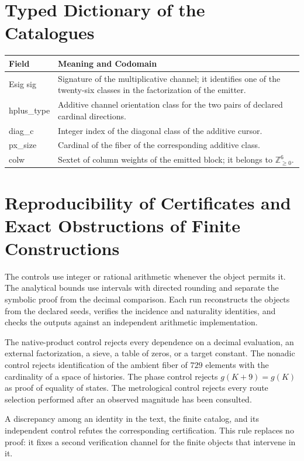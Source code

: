 \section{Typed Dictionary of the Catalogues}

\begin{longtable}{>{\ttfamily}p{}>{\raggedright\arraybackslash}p{}}
\toprule
Field & Meaning and Codomain\\
\midrule
\endhead
Esig sig & Signature of the multiplicative channel; it identifies one of the twenty-six
classes in the factorization of the emitter.\\
hplus\_type & Additive channel orientation class for the two pairs of declared cardinal directions.\\
diag\_c & Integer index of the diagonal class of the additive cursor.\\
px\_size & Cardinal of the fiber of the corresponding additive class.\\
colw & Sextet of column weights of the emitted block; it belongs to
\(\mathbb Z_{\geq0}^{6}\).\\
\bottomrule
\end{longtable}

\section{Reproducibility of Certificates and Exact Obstructions of Finite Constructions}

The controls use integer or rational arithmetic whenever the object
permits it. The analytical bounds use intervals with directed rounding and
separate the symbolic proof from the decimal comparison. Each run
reconstructs the objects from the declared seeds, verifies the incidence and
naturality identities, and checks the outputs against an independent
arithmetic implementation.

The native-product control rejects every dependence on a decimal evaluation, an external factorization, a sieve, a table of zeros, or a target constant. The nonadic control rejects identification of the ambient fiber of \(729\) elements with the cardinality of a space of histories. The phase control rejects \(g(K+9)=g(K)\) as proof of equality of states. The metrological control rejects every route selection performed after an observed magnitude has been consulted.

A discrepancy among an identity in the text, the finite catalog, and its
independent control refutes the corresponding certification. This rule replaces
no proof: it fixes a second verification channel for the finite objects
that intervene in it.
